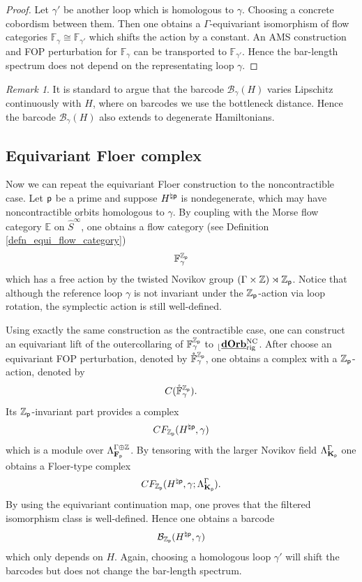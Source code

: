 \documentclass[reqno, 10pt]{amsart}
\numberwithin{equation}{section}
\numberwithin{equation}{section}
\theoremstyle{definition}
\theoremstyle{remark}
\newtheorem{rem}[thm]{Remark}
\newcommand{\beqn}{\begin{equation*}}
\newcommand{\eeqn}{\end{equation*}}
\newcommand{\mb}{\mathbb}
\newcommand{\mc}{\mathcal}
\newcommand{\p}{{\sf p}}
\newcommand{\fp}{{\bf F}_{\sf p}}
\newcommand{\kp}{{\bf K}_{\sf p}}
\newcommand{\zp}{{{\mb Z}_{\sf p}}}
\newcommand{\ep}{{{\mathbb E}}}
\renewcommand{\outer}{{}_{\lfloor}}
\newcommand{\wh}{\widehat}
\newcommand{\uds}[1]{\underline{\smash{#1}}}
\begin{document}
\begin{proof}
Let $\gamma'$ be another loop which is homologous to $\gamma$. Choosing a concrete cobordism between them. Then one obtains a $\Gamma$-equivariant isomorphism of flow categories ${\mb F}_\gamma \cong {\mb F}_{\gamma'}$ which shifts the action by a constant. An AMS construction and FOP perturbation for ${\mb F}_\gamma$ can be transported to ${\mb F}_{\gamma'}$. Hence the bar-length spectrum does not depend on the representating loop $\gamma$.
\end{proof}

\begin{rem}
It is standard to argue that the barcode ${\mc B}_\gamma(H)$ varies Lipschitz continuously with $H$, where on barcodes we use the bottleneck distance. Hence the barcode ${\mc B}_\gamma(H)$ also extends to degenerate Hamiltonians.
\end{rem}

\subsection{Equivariant Floer complex}\label{subsec:equiv-noncontrat}

Now we can repeat the equivariant Floer construction to the noncontractible case. Let $\p$ be a prime and suppose $H^{\natural \p}$ is nondegenerate, which may have noncontractible orbits homologous to $\gamma$. By coupling with the Morse flow category $\ep$ on $\wh S^\infty$, one obtains a flow category (see Definition \ref{defn_equi_flow_category})
\beqn
{\mb F}_{\gamma}^{\zp}
\eeqn
which has a free action by the twisted Novikov group $(\Gamma \times {\mb Z}) \rtimes \zp$. Notice that although the reference loop $\gamma$ is not invariant under the $\zp$-action via loop rotation, the symplectic action is still well-defined. 

Using exactly the same construction as the contractible case, one can construct an equivariant lift of the outercollaring of ${\mb F}_\gamma^{\zp}$ to $\outer \uds{\bf dOrb}_{\rm rig}^{\rm NC}$. After choose an equivariant FOP perturbation, denoted by $\mathring {\mb F}_\gamma^\zp$, one obtains a complex with a $\zp$-action, denoted by 
\beqn
C(\mathring {\mb F}_\gamma^\zp).
\eeqn
Its $\zp$-invariant part provides a complex
\beqn
CF_{\zp}(H^{\natural\p}, \gamma)
\eeqn
which is a module over $\Lambda_{\fp}^{\Gamma \oplus {\mb Z}}$. By tensoring with the larger Novikov field $\Lambda_{\kp}^{\Gamma}$ one obtains a Floer-type complex
\beqn
CF_{\zp}(H^{\natural \p}, \gamma; \Lambda_{\kp}^\Gamma).
\eeqn
By using the equivariant continuation map, one proves that the filtered isomorphism class is well-defined. Hence one obtains a barcode
\beqn
{\mc B}_{\zp} (H^{\natural \p}, \gamma)
\eeqn
which only depends on $H$. Again, choosing a homologous loop $\gamma'$ will shift the barcodes but does not change the bar-length spectrum.
\end{document}
